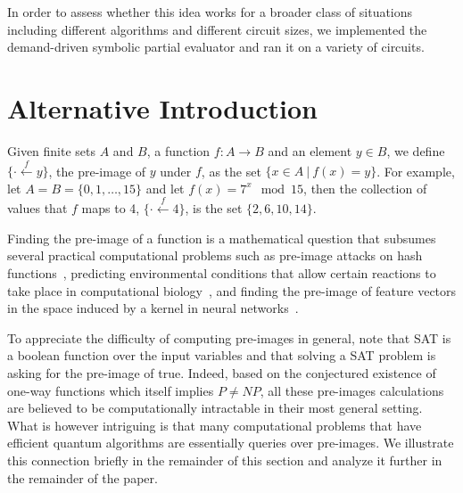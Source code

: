 \documentclass{article}
\newcommand{\preim}[2]{\{\cdot\stackrel{#1}{\longleftarrow}{#2}\}}
\begin{document}
In order to assess whether this idea works for a broader class of
situations including different algorithms and different circuit sizes,
we implemented the demand-driven symbolic partial evaluator and ran it
on a variety of circuits.

\section{Alternative Introduction}

Given finite sets $A$ and $B$, a function $f : A \rightarrow B$ and an
element $y \in B$, we define $\preim{f}{y}$, the pre-image of $y$
under $f$, as the set $\{ x \in A ~|~ f(x) = y \}$. For example, let
$A = B = \{0,1,\ldots,15\}$ and let $f(x) = 7^x \mod 15$, then the
collection of values that $f$ maps to 4, $\preim{f}{4}$, is the set
$\{ 2, 6, 10, 14 \}$.

\begin{center}
\end{center}

Finding the pre-image of a function is a mathematical question that
subsumes several practical computational problems such as pre-image
attacks on hash functions~\cite{10.1007/978-3-540-25937-4_24},
predicting environmental conditions that allow certain reactions to
take place in computational
biology~\cite{Klotz2013,akutsu2009analyses}, and finding the pre-image
of feature vectors in the space induced by a kernel in neural
networks~\cite{1353287}.

To appreciate the difficulty of computing pre-images in general, note
that SAT is a boolean function over the input variables and that
solving a SAT problem is asking for the pre-image of
\textsf{true}. Indeed, based on the conjectured existence of one-way
functions which itself implies $\mathit{P} \neq \mathit{NP}$, all
these pre-images calculations are believed to be computationally
intractable in their most general setting. What is however intriguing
is that many computational problems that have efficient quantum
algorithms are essentially queries over pre-images. We illustrate this
connection briefly in the remainder of this section and analyze it
further in the remainder of the paper.
\end{document}
